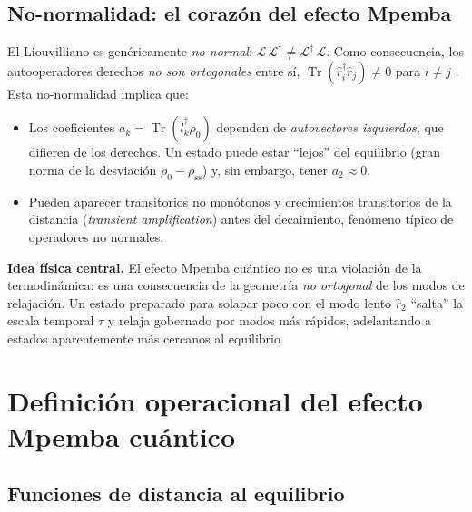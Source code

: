 \documentclass[11pt,a4paper]{article}
\theoremstyle{definition}
\theoremstyle{plain}
\newcommand{\Lop}{\mathcal{L}}
\newcommand{\Ldual}{\mathcal{L}^{\dagger}}
\newcommand{\rss}{\rho_{\mathrm{ss}}}
\renewcommand{\Tr}{\operatorname{Tr}}
\begin{document}
\subsection{No-normalidad: el corazón del efecto Mpemba}

El Liouvilliano es genéricamente \emph{no normal}: $\Lop\,\Ldual\neq\Ldual\,\Lop$. Como consecuencia, los
autooperadores derechos \emph{no son ortogonales} entre sí, $\Tr(\hat r_i^{\dagger}\hat r_j)\neq0$ para
$i\neq j$ \cite{LiYang2026,Minganti2018}. Esta no-normalidad implica que:
\begin{itemize}[leftmargin=1.6em,itemsep=2pt]
\item Los coeficientes $a_k=\Tr(\hat l_k^{\dagger}\rho_0)$ dependen de \emph{autovectores izquierdos}, que
difieren de los derechos. Un estado puede estar ``lejos'' del equilibrio (gran norma de la desviación
$\rho_0-\rss$) y, sin embargo, tener $a_2\approx0$.
\item Pueden aparecer transitorios no monótonos y crecimientos transitorios de la distancia
(\emph{transient amplification}) antes del decaimiento, fenómeno típico de operadores no normales.
\end{itemize}

\begin{cajaclave}
\textbf{Idea física central.} El efecto Mpemba cuántico no es una violación de la termodinámica: es una
consecuencia de la geometría \emph{no ortogonal} de los modos de relajación. Un estado preparado para
solapar poco con el modo lento $\hat r_2$ ``salta'' la escala temporal $\tau$ y relaja gobernado por modos
más rápidos, adelantando a estados aparentemente más cercanos al equilibrio.
\end{cajaclave}

\section{Definición operacional del efecto Mpemba cuántico}

\subsection{Funciones de distancia al equilibrio}
\end{document}
